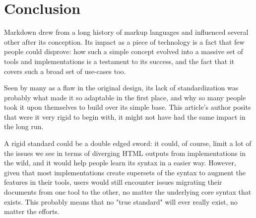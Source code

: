 \chapter{Conclusion}
\label{chap:conclusion}

\vspace{1cm}

Markdown drew from a long history of markup languages and influenced several other after its conception. Its impact as a piece of
technology is a fact that few people could disprove: how such a simple concept evolved into a massive set of tools and implementations
is a testament to its success, and the fact that it covers such a broad set of use-cases too.\newline

Seen by many as a flaw in the original design, its lack of standardization was probably what made it so adaptable in the first
place, and why so many people took it upon themselves to build over its simple base. This article's author posits that were it
very rigid to begin with, it might not have had the same impact in the long run.\newline

A rigid standard could be a double edged sword: it could, of course, limit a lot of the issues we see in terms of diverging HTML
outputs from implementations in the wild, and it would help people learn its syntax in a easier way. However, given that most
implementations create supersets of the syntax to augment the features in their tools, users would still encounter issues migrating
their documents from one tool to the other, no matter the underlying core syntax that exists. This probably means that no "true standard"
will ever really exist, no matter the efforts.
